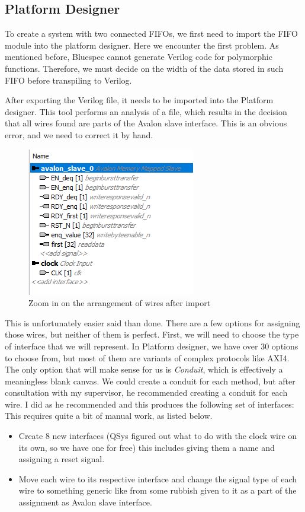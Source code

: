 \documentclass[12pt]{report}
\begin{document}
\subsection{Platform Designer} 
To create a system with two connected FIFOs, we first need to import the FIFO module into the platform designer. 
Here we encounter the first problem. 
As mentioned before, Bluespec cannot generate Verilog code for polymorphic functions. 
Therefore, we must decide on the width of the data stored in such FIFO before transpiling to Verilog. 
\par
After exporting the Verilog file, it needs to be imported into the Platform designer. 
This tool performs an analysis of a file, which results in the decision that all wires found are parts of the Avalon slave interface. 
This is an obvious error, and we need to correct it by hand. 
\begin{figure}[H] 
    \centering 
    \includegraphics[width=0.5\columnwidth]{images/Example1BeforeOranization.png} \caption{Zoom in on the arrangement of wires after import} 
\end{figure} 
This is unfortunately easier said than done. 
There are a few options for assigning those wires, but neither of them is perfect.
First, we will need to choose the type of interface that we will represent. In Platform designer, we have over 30 options to choose from, but most of them are variants of complex protocols like AXI4. 
The only option that will make sense for us is \emph{Conduit}, which is effectively a meaningless blank canvas. We could create a conduit for each method, but after consultation with my supervisor, he recommended creating a conduit for each wire. 
I did as he recommended and this produces the following set of interfaces: This requires quite a bit of manual work, as listed below. 
\begin{itemize} 
    \item Create 8 new interfaces (QSys figured out what to do with the clock wire on its own, so we have one for free) this includes giving them a name and assigning a reset signal. 
    \item Move each wire to its respective interface and change the signal type of each wire to something generic like  from some rubbish given to it as a part of the assignment as Avalon slave interface.
\end{itemize} 
\end{document}
